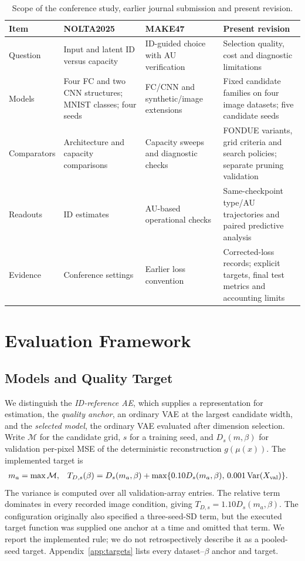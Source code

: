 \begin{table}[H]
\caption{Scope of the conference study, earlier journal submission and present revision.}
\label{tab:history}\small
\begin{tabularx}{\textwidth}{lXXX}\toprule
Item & NOLTA2025 & MAKE47 & Present revision \\\midrule
Question & Input and latent ID versus capacity & ID-guided choice with AU verification & Selection quality, cost and diagnostic limitations \\
Models & Four FC and two CNN structures; MNIST classes; four seeds & FC/CNN and synthetic/image extensions & Fixed candidate families on four image datasets; five candidate seeds \\
Comparators & Architecture and capacity comparisons & Capacity sweeps and diagnostic checks & FONDUE variants, grid criteria and search policies; separate pruning validation \\
Readouts & ID estimates & AU-based operational checks & Same-checkpoint type/AU trajectories and paired predictive analysis \\
Evidence & Conference settings & Earlier loss convention & Corrected-loss records; explicit targets, final test metrics and accounting limits \\
\bottomrule\end{tabularx}
\end{table}

\section{Evaluation Framework}\label{sec:framework}

\subsection{Models and Quality Target}\label{sec:quality}
We distinguish the \emph{ID-reference AE}, which supplies a representation
for estimation, the \emph{quality anchor}, an ordinary VAE at the largest
candidate width, and the \emph{selected model}, the ordinary VAE evaluated
after dimension selection. Write $\mathcal M$ for the candidate grid,
$s$ for a training seed, and $D_s(m,\beta)$ for validation per-pixel MSE
of the deterministic reconstruction $g(\mu(x))$. The implemented target is
\begin{align}
 m_a&=\max\mathcal M, &
 T_{D,s}(\beta)&=D_s(m_a,\beta)
 +\max\{0.10D_s(m_a,\beta),\,0.001\operatorname{Var}(X_{\rm val})\}.
 \label{eq:target}
\end{align}
The variance is computed over all validation-array entries. The relative
term dominates in every recorded image condition, giving
$T_{D,s}=1.10D_s(m_a,\beta)$. The configuration originally also specified a
three-seed-SD term, but the executed target function was supplied one
anchor at a time and omitted that term. We report the implemented rule;
we do not retrospectively describe it as a pooled-seed target.
Appendix~\ref{app:targets} lists every dataset--$\beta$ anchor and target.

